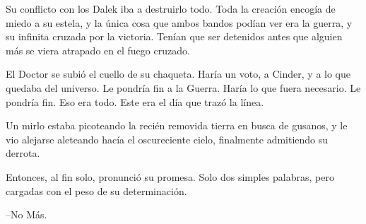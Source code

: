 Su conflicto con los Dalek iba a destruirlo todo. Toda la creación encogía de miedo a su estela, y la única cosa que ambos bandos podían ver era la guerra, y su infinita cruzada por la victoria. Tenían que ser detenidos antes que alguien más se viera atrapado en el fuego cruzado.

El Doctor se subió el cuello de su chaqueta. Haría un voto, a Cinder, y a lo que quedaba del universo. Le pondría fin a la Guerra. Haría lo que fuera necesario. Le pondría fin. Eso era todo. Este era el día que trazó la línea.

Un mirlo estaba picoteando la recién removida tierra en busca de gusanos, y le vio alejarse aleteando hacía el oscureciente cielo, finalmente admitiendo su derrota.

Entonces, al fin solo, pronunció su promesa. Solo dos simples palabras, pero cargadas con el peso de su determinación.

--No Más.